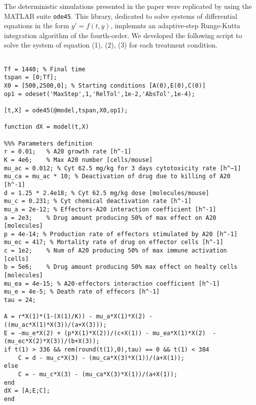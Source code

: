 The deterministic simulations presented in the paper were replicated by using the MATLAB suite \texttt{ode45}. This library, dedicated to solve systems of differential equations in the form $y'=f(t,y)$, implemnts an adaptive-step Runge-Kutta integration algorithm of the fourth-order. 
We developed the following script to solve the system of equation (1), (2), (3) for each treatment condition.

\begin{lstlisting}

Tf = 1440; % Final time
tspan = [0;Tf];
X0 = [500,2500,0]; % Starting conditions [A(0),E(0),C(0)]
op1 = odeset('MaxStep',1,'RelTol',1e-2,'AbsTol',1e-4);

[t,X] = ode45(@model,tspan,X0,op1);

function dX = model(t,X)

%%% Parameters definition
r = 0.01;   % A20 growth rate [h^-1]
K = 4e6;    % Max A20 number [cells/mouse]
mu_ac = 0.012; % Cyt 62.5 mg/kg for 3 days cytotoxicity rate [h^−1]
mu_ca = mu_ac * 10; % Deactivation of drug due to killing of A20 [h^-1]
d = 1.25 * 2.4e18; % Cyt 62.5 mg/kg dose [molecules/mouse]
mu_c = 0.231; % Cyt chemical deactivation rate [h^-1]
mu_a = 2e-12; % Effectors-A20 interaction coefficient [h^-1]
a = 2e3;    % Drug amount producing 50% of max effect on A20 [molecules]
p = 4e-14; % Production rate of effectors stimulated by A20 [h^-1]
mu_ec = 417; % Mortality rate of drug on effector cells [h^-1]
c = 1e2;    % Num of A20 producing 50% of max immune activation [cells]
b = 5e6;    % Drug amount producing 50% max effect on healty cells [molecules]
mu_ea = 4e-15; % A20-effectors interaction coefficient [h^-1]
mu_e = 4e-5; % Death rate of effecors [h^-1]
tau = 24;

A = r*X(1)*(1-(X(1)/K)) - mu_a*X(1)*X(2) - ((mu_ac*X(1)*X(3))/(a+X(3)));
E = -mu_e*X(2) + (p*X(1)*X(2))/(c+X(1)) - mu_ea*X(1)*X(2)  - (mu_ec*X(2)*X(3))/(b+X(3));
if t(1) > 336 && rem(round(t(1),0),tau) == 0 && t(1) < 384
    C = d - mu_c*X(3) - (mu_ca*X(3)*X(1))/(a+X(1)); 
else
    C = - mu_c*X(3) - (mu_ca*X(3)*X(1))/(a+X(1));
end
dX = [A;E;C];
end

\end{lstlisting}

